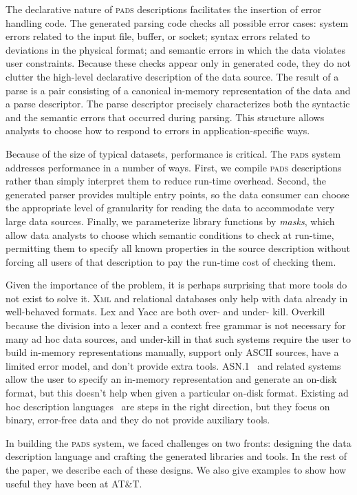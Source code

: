 \documentclass{sigplanconf}
\newcommand{\pads}{\textsc{pads}}
\newcommand{\xml}{\textsc{Xml}}
\begin{document}
The declarative nature of \pads{} descriptions facilitates the
insertion of error handling code.
The generated parsing code checks all possible error cases: system
errors related to the input file, buffer, or socket; syntax errors
related to deviations in the physical format; and semantic errors in
which the data violates user constraints.  Because these checks appear
only in generated code, they do not clutter the high-level declarative
description of the data source.
The result of a parse is a pair consisting of a canonical in-memory
representation of the data and a parse descriptor. The parse
descriptor precisely characterizes both the syntactic and the semantic
errors that occurred during parsing.  This structure allows analysts
to choose how to respond to errors in application-specific ways.  

Because of the size of typical datasets, performance is critical. The \pads{} system addresses performance in a number of ways.
First, we compile \pads{} descriptions rather than simply interpret them to reduce run-time overhead.
Second, the generated parser provides  multiple entry points, so the data consumer can choose 
the appropriate level of granularity for reading the data to accommodate very large data sources.
Finally, we parameterize library functions by \textit{masks}, which allow data analysts to 
choose which semantic conditions to check at run-time, permitting them to specify
all known properties in the source description without forcing all users of that 
description to pay the run-time cost of checking them.  

Given the importance of the problem, it is perhaps surprising
that more tools do not exist to solve it.  \xml{} and relational databases
only help with data already in well-behaved formats.  Lex and Yacc are both
over- and under- kill.  Overkill because the division into a lexer and a context free grammar is not necessary for many ad hoc data sources, and under-kill in that such systems require the user to build in-memory representations manually,
support only ASCII sources, have a limited error model, and don't provide extra tools.  ASN.1~\cite{asn} and related systems~\cite{asdl} allow the user to specify an in-memory representation and generate an on-disk format, but this doesn't help when given a particular on-disk format.  
Existing ad hoc description languages~\cite{gpce02,sigcomm00,erlang} are steps 
in the right direction, but they focus on binary, error-free data and they do not provide auxiliary tools.

In building the \pads{} system, we faced challenges on two fronts:
designing the data description language and
crafting the generated libraries and tools.
In the rest of the paper, 
we describe each of these designs.
We also give examples to show how useful they have been at AT\&T.
\end{document}
